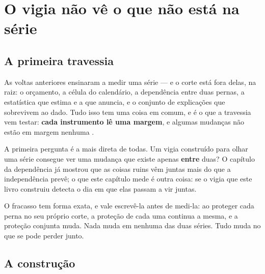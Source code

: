 %
%

\chapter{O vigia não vê o que não está na série}
\label{cap:dependencia_vigiada}

\section{A primeira travessia}

As voltas anteriores ensinaram a medir uma série --- e o corte está fora delas, na raiz: o orçamento, a
célula do calendário, a dependência entre duas pernas, a estatística que estima e a que anuncia, e o
conjunto de explicações que sobrevivem ao dado. Tudo
isso tem uma coisa em comum, e é o que a travessia vem testar: \textbf{cada instrumento lê uma margem},
e algumas mudanças não estão em margem nenhuma \cite{ansari2021sklar}.

A primeira pergunta é a mais direta de todas. Um vigia construído para
olhar uma série consegue ver uma mudança que existe apenas \textbf{entre} duas? O capítulo da
dependência já mostrou que as coisas ruins vêm juntas mais do que a independência prevê; o que
este capítulo mede é outra coisa: se o vigia que este livro construiu detecta o dia em que elas
passam a vir juntas.

O fracasso tem forma exata, e vale escrevê-la antes de medi-la: ao proteger cada perna no seu
próprio corte, a proteção de cada uma continua a mesma, e a proteção conjunta muda. Nada muda em
nenhuma das duas séries. Tudo muda no que se pode perder junto.

\section{A construção}


